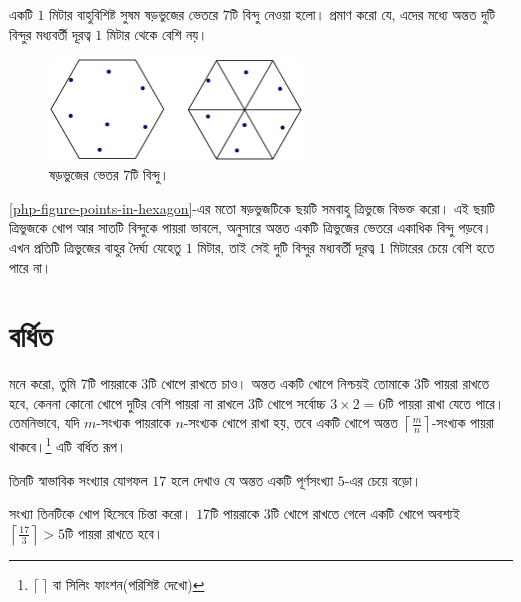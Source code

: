 \begin{example}
	একটি $1$ মিটার বাহুবিশিষ্ট সুষম ষড়ভুজের ভেতরে $7$টি বিন্দু নেওয়া হলো। প্রমাণ করো যে, এদের মধ্যে অন্তত দুটি বিন্দুর মধ্যবর্তী দূরত্ব $1$ মিটার থেকে বেশি নয়।
\end{example}

\begin{figure}[htb]
	\centering
	\includegraphics[width=0.6\textwidth]{img/pigeonhole_principle/points-in-hexagon}
	\caption{ষড়ভুজের ভেতর $7$টি বিন্দু।}\label{php-figure-points-in-hexagon}
\end{figure}

\begin{solution}
	\autoref{php-figure-points-in-hexagon}-এর মতো ষড়ভুজটিকে ছয়টি সমবাহু ত্রিভুজে বিভক্ত করো। এই ছয়টি ত্রিভুজকে খোপ আর সাতটি বিন্দুকে পায়রা ভাবলে, \phpname{} অনুসারে অন্তত একটি ত্রিভুজের ভেতরে একাধিক বিন্দু পড়বে। এখন প্রতিটি ত্রিভুজের বাহুর দৈর্ঘ্য যেহেতু $1$ মিটার, তাই সেই দুটি বিন্দুর মধ্যবর্তী দূরত্ব $1$ মিটারের চেয়ে বেশি হতে পারে না।
\end{solution}

\section{বর্ধিত \phpname}
মনে করো, তুমি $7$টি পায়রাকে $3$টি খোপে রাখতে চাও। অন্তত একটি খোপে নিশ্চয়ই তোমাকে $3$টি পায়রা রাখতে হবে, কেননা কোনো খোপে দুটির বেশি পায়রা না রাখলে $3$টি খোপে সর্বোচ্চ $3\times2=6$টি পায়রা রাখা যেতে পারে। তেমনিভাবে, যদি  $m$-সংখ্যক পায়রাকে $n$-সংখ্যক খোপে রাখা হয়, তবে একটি খোপে অন্তত $\left\lceil\frac{m}{n}\right\rceil$-সংখ্যক পায়রা থাকবে।\footnote{$\lceil\ \rceil$ বা সিলিং ফাংশন(পরিশিষ্ট দেখো)} এটি \phpnamer{} বর্ধিত রূপ।

\begin{example}
	তিনটি স্বাভাবিক সংখ্যার যোগফল $17$ হলে দেখাও যে অন্তত একটি পূর্ণসংখ্যা $5$-এর চেয়ে বড়ো।
\end{example}
\begin{solution}
	সংখ্যা তিনটিকে খোপ হিসেবে চিন্তা করো। $17$টি পায়রাকে $3$টি খোপে রাখতে গেলে একটি খোপে অবশ্যই $\left\lceil\frac{17}{3}\right\rceil>5$টি পায়রা রাখতে হবে।
\end{solution}

